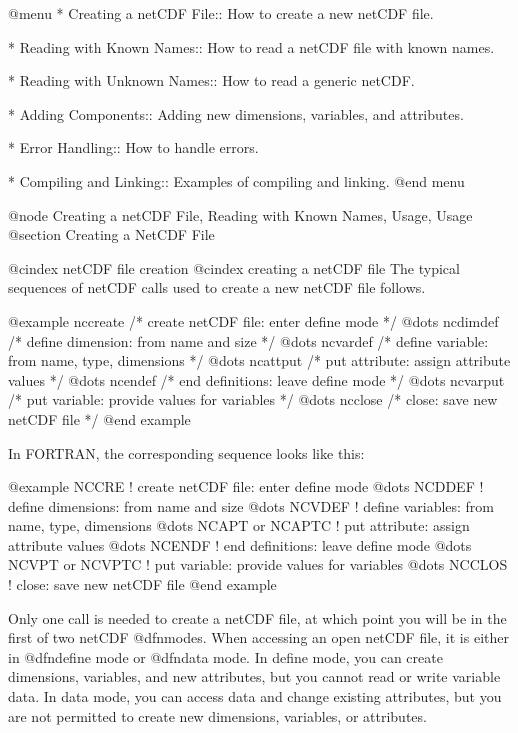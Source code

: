 @menu
* Creating a netCDF File::      How to create a new netCDF file.

* Reading with Known Names::    How to read a netCDF file with known names.

* Reading with Unknown Names::  How to read a generic netCDF.

* Adding Components::           Adding new dimensions, variables, and attributes.

* Error Handling::              How to handle errors.

* Compiling and Linking::       Examples of compiling and linking.
@end menu

@node Creating a netCDF File, Reading with Known Names, Usage, Usage
@section Creating a NetCDF File

@cindex netCDF file creation
@cindex creating a netCDF file
The typical sequences of netCDF calls used to create a new netCDF file
follows.

@example
    nccreate      /* create netCDF file: enter define mode */
         @dots{}
       ncdimdef   /* define dimension: from name and size */
         @dots{}
       ncvardef   /* define variable: from name, type, dimensions */
         @dots{}
       ncattput   /* put attribute: assign attribute values */
         @dots{}
    ncendef       /* end definitions: leave define mode */
         @dots{}
       ncvarput   /* put variable: provide values for variables */
         @dots{}
    ncclose       /* close: save new netCDF file */
@end example

In FORTRAN, the corresponding sequence looks like this:

@example
    NCCRE              ! create netCDF file: enter define mode
         @dots{}
       NCDDEF          ! define dimensions: from name and size
         @dots{}
       NCVDEF          ! define variables: from name, type, dimensions
         @dots{}
       NCAPT or NCAPTC ! put attribute: assign attribute values
         @dots{}
    NCENDF             ! end definitions: leave define mode
         @dots{}
       NCVPT or NCVPTC ! put variable: provide values for variables
         @dots{}
    NCCLOS             ! close: save new netCDF file
@end example

Only one call is needed to create a netCDF file, at which
point you will be in the first of two netCDF @dfn{modes}.  When
accessing an open netCDF file, it is either in @dfn{define mode} or @dfn{data
mode}.  In define mode, you can create dimensions, variables, and new
attributes, but you cannot read or write variable data.  In data mode,
you can access data and change existing attributes, but you are not
permitted to create new dimensions, variables, or attributes.

